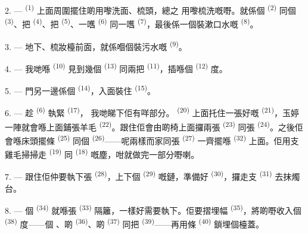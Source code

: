 2. ---  \textsuperscript{(1)} 上面周圍擺住啲用嚟洗面、梳頭，總之
用嚟梳洗嘅嘢。就係個 \textsuperscript{(2)} 同個
\textsuperscript{(3)}、把 \textsuperscript{(4)}、把
\textsuperscript{(5)}、一嚿 \textsuperscript{(6)} 同一嚿
\textsuperscript{(7)}，最後係一個裝漱口水嘅 \textsuperscript{(8)}。

3. --- 地下、梳妝檯前面，就係嗰個裝污水嘅 \textsuperscript{(9)}。

4. --- 我哋喺 \textsuperscript{(10)} 見到幾個
\textsuperscript{(13)} 同兩把 \textsuperscript{(11)}，插喺個
\textsuperscript{(12)} 度。

5. --- 門另一邊係個 \textsuperscript{(14)}，入面裝住
\textsuperscript{(15)}。

6. --- 趁 \textsuperscript{(6)} 執緊 \textsuperscript{(17)}，
我哋睇下佢有咩部分。 \textsuperscript{(20)} 上面托住一張好嘅
 \textsuperscript{(21)}，玉婷一陣就會喺上面鋪張羊毛
\textsuperscript{(22)}。跟住佢會由啲椅上面攞兩張 \textsuperscript{(23)}
同張 \textsuperscript{(24)}。之後佢會喺床頭擺條
\textsuperscript{(25)} 同個 \textsuperscript{(26)}——呢兩樣而家同張
 \textsuperscript{(27)} 一齊擺喺 \textsuperscript{(32)}
上面。佢用支雞毛掃掃走 \textsuperscript{(19)} 同
\textsuperscript{(18)} 嘅塵，咁就做完一部分嘢喇。

7. --- 跟住佢仲要執下張 \textsuperscript{(28)}，上下個
\textsuperscript{(29)} 嘅鏈，準備好 \textsuperscript{(30)}，攞走支
 \textsuperscript{(31)} 去抹燭台。

\VUsaut{5.0mm}
\VUsaut{3.0mm}

8. --- 個 \textsuperscript{(34)} 就喺張
\textsuperscript{(33)} 隔籬，一樣好需要執下。佢要摺埋幅
\textsuperscript{(35)}，將啲嘢收入個 \textsuperscript{(38)} 度——個
、啲 \textsuperscript{(36)}、啲
\textsuperscript{(37)} 同把 \textsuperscript{(39)}——再用條
 \textsuperscript{(40)} 鎖埋個檯蓋。

